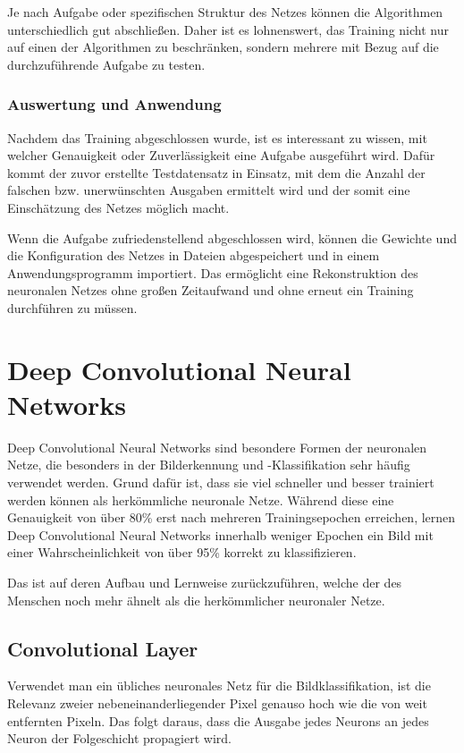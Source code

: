 \documentclass[12pt,a4]{article}
\begin{document}
Je nach Aufgabe oder spezifischen Struktur des Netzes können die Algorithmen unterschiedlich gut abschließen. Daher ist es lohnenswert, das Training nicht nur auf einen der Algorithmen zu beschränken, sondern mehrere mit Bezug auf die durchzuführende Aufgabe zu testen.

\subsubsection{Auswertung und Anwendung}
Nachdem das Training abgeschlossen wurde, ist es interessant zu wissen, mit welcher Genauigkeit oder Zuverlässigkeit eine Aufgabe ausgeführt wird. Dafür kommt der zuvor erstellte Testdatensatz in Einsatz, mit dem die Anzahl der falschen bzw. unerwünschten Ausgaben ermittelt wird und der somit eine Einschätzung des Netzes möglich macht.

Wenn die Aufgabe zufriedenstellend abgeschlossen wird, können die Gewichte und die Konfiguration des Netzes in Dateien abgespeichert und in einem Anwendungsprogramm importiert. Das ermöglicht eine Rekonstruktion des neuronalen Netzes ohne großen Zeitaufwand und ohne erneut ein Training durchführen zu müssen.

\section{Deep Convolutional Neural Networks \cite{PythonMachineLearningChapter15}}
Deep Convolutional Neural Networks sind besondere Formen der neuronalen Netze, die besonders in der Bilderkennung und -Klassifikation sehr häufig verwendet werden. Grund dafür ist, dass sie viel schneller und besser trainiert werden können als herkömmliche neuronale Netze. Während diese eine Genauigkeit von über 80\% erst nach mehreren Trainingsepochen erreichen, lernen Deep Convolutional Neural Networks innerhalb weniger Epochen ein Bild mit einer Wahrscheinlichkeit von über 95\% korrekt zu klassifizieren.

Das ist auf deren Aufbau und Lernweise zurückzuführen, welche der des Menschen noch mehr ähnelt als die herkömmlicher neuronaler Netze.

\subsection{Convolutional Layer}
Verwendet man ein übliches neuronales Netz für die Bildklassifikation, ist die Relevanz zweier nebeneinanderliegender Pixel genauso hoch wie die von weit entfernten Pixeln. Das folgt daraus, dass die Ausgabe jedes Neurons an jedes Neuron der Folgeschicht propagiert wird.
\end{document}
